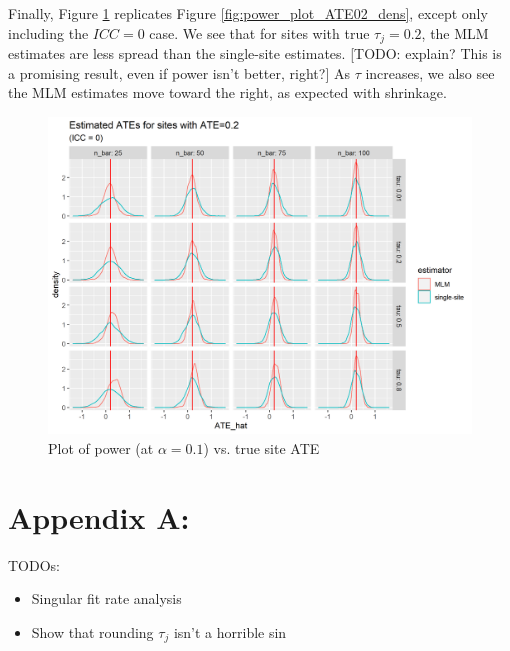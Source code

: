 \documentclass[]{article}
\begin{document}
Finally, Figure \ref{fig:power_plot_comp_ATE02_dens} replicates Figure \ref{fig:power_plot_ATE02_dens}, except only including the $ICC = 0$ case.
We see that for sites with true $\tau_j = 0.2$, the MLM estimates are less spread than the single-site estimates.
[TODO: explain? This is a promising result, even if power isn't better, right?]
As $\tau$ increases, we also see the MLM estimates move toward the right, as expected with shrinkage.

\begin{figure}[ht]
	\centering
	\includegraphics[width=\textwidth]{power_plot_comp_ATE02_dens}
	\caption{Plot of power (at $\alpha = 0.1$) vs. true site ATE}
	\label{fig:power_plot_comp_ATE02_dens}
\end{figure}

\appendix
\section{Appendix A: }

TODOs:
\begin{itemize}
	\item Singular fit rate analysis
	\item Show that rounding $\tau_j$ isn't a horrible sin
\end{itemize}
	
\end{document}
